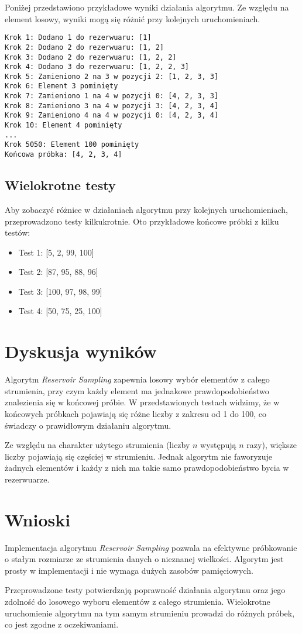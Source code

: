 \documentclass{article}
\begin{document}
Poniżej przedstawiono przykładowe wyniki działania algorytmu. Ze względu na element losowy, wyniki mogą się różnić przy kolejnych uruchomieniach.

\begin{verbatim}
Krok 1: Dodano 1 do rezerwuaru: [1]
Krok 2: Dodano 2 do rezerwuaru: [1, 2]
Krok 3: Dodano 2 do rezerwuaru: [1, 2, 2]
Krok 4: Dodano 3 do rezerwuaru: [1, 2, 2, 3]
Krok 5: Zamieniono 2 na 3 w pozycji 2: [1, 2, 3, 3]
Krok 6: Element 3 pominięty
Krok 7: Zamieniono 1 na 4 w pozycji 0: [4, 2, 3, 3]
Krok 8: Zamieniono 3 na 4 w pozycji 3: [4, 2, 3, 4]
Krok 9: Zamieniono 4 na 4 w pozycji 0: [4, 2, 3, 4]
Krok 10: Element 4 pominięty
...
Krok 5050: Element 100 pominięty
Końcowa próbka: [4, 2, 3, 4]
\end{verbatim}

\subsection{Wielokrotne testy}

Aby zobaczyć różnice w działaniach algorytmu przy kolejnych uruchomieniach, przeprowadzono testy kilkukrotnie. Oto przykładowe końcowe próbki z kilku testów:

\begin{itemize}
    \item Test 1: [5, 2, 99, 100]
    \item Test 2: [87, 95, 88, 96]
    \item Test 3: [100, 97, 98, 99]
    \item Test 4: [50, 75, 25, 100]
\end{itemize}

\section{Dyskusja wyników}

Algorytm \textit{Reservoir Sampling} zapewnia losowy wybór elementów z całego strumienia, przy czym każdy element ma jednakowe prawdopodobieństwo znalezienia się w końcowej próbie. W przedstawionych testach widzimy, że w końcowych próbkach pojawiają się różne liczby z zakresu od 1 do 100, co świadczy o prawidłowym działaniu algorytmu.

Ze względu na charakter użytego strumienia (liczby $n$ występują $n$ razy), większe liczby pojawiają się częściej w strumieniu. Jednak algorytm nie faworyzuje żadnych elementów i każdy z nich ma takie samo prawdopodobieństwo bycia w rezerwuarze.

\section{Wnioski}

Implementacja algorytmu \textit{Reservoir Sampling} pozwala na efektywne próbkowanie o stałym rozmiarze ze strumienia danych o nieznanej wielkości. Algorytm jest prosty w implementacji i nie wymaga dużych zasobów pamięciowych.

Przeprowadzone testy potwierdzają poprawność działania algorytmu oraz jego zdolność do losowego wyboru elementów z całego strumienia. Wielokrotne uruchomienie algorytmu na tym samym strumieniu prowadzi do różnych próbek, co jest zgodne z oczekiwaniami.
\end{document}
